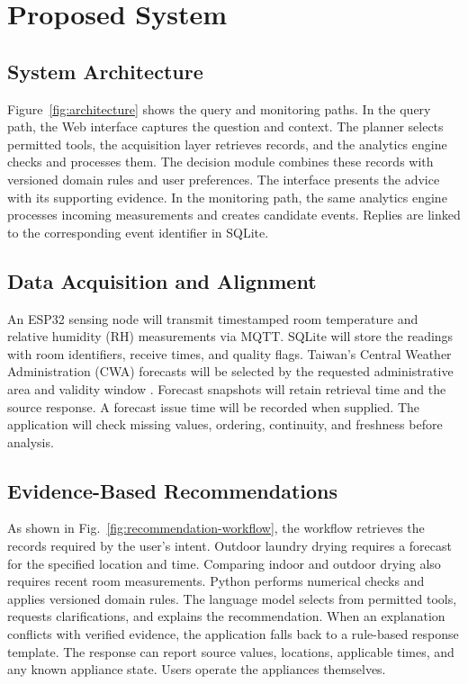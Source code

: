 \section{Proposed System}
\subsection{System Architecture}
Figure~\ref{fig:architecture} shows the query and monitoring paths. In the query path, the Web interface captures the question and context. The planner selects permitted tools, the acquisition layer retrieves records, and the analytics engine checks and processes them. The decision module combines these records with versioned domain rules and user preferences. The interface presents the advice with its supporting evidence. In the monitoring path, the same analytics engine processes incoming measurements and creates candidate events. Replies are linked to the corresponding event identifier in SQLite.



\subsection{Data Acquisition and Alignment}
An ESP32 sensing node will transmit timestamped room temperature and relative humidity (RH) measurements via MQTT. SQLite will store the readings with room identifiers, receive times, and quality flags. Taiwan's Central Weather Administration (CWA) forecasts will be selected by the requested administrative area and validity window \cite{cwa_open_data}. Forecast snapshots will retain retrieval time and the source response. A forecast issue time will be recorded when supplied. The application will check missing values, ordering, continuity, and freshness before analysis.

\subsection{Evidence-Based Recommendations}
As shown in Fig.~\ref{fig:recommendation-workflow}, the workflow retrieves the records required by the user's intent. Outdoor laundry drying requires a forecast for the specified location and time. Comparing indoor and outdoor drying also requires recent room measurements. Python performs numerical checks and applies versioned domain rules. The language model selects from permitted tools, requests clarifications, and explains the recommendation. When an explanation conflicts with verified evidence, the application falls back to a rule-based response template. The response can report source values, locations, applicable times, and any known appliance state. Users operate the appliances themselves.

